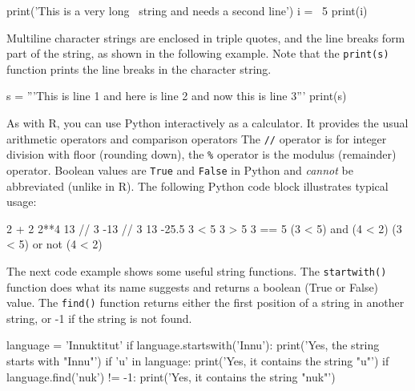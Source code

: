 \begin{samepage}
\begin{pythoncode}
print('This is a very long \
string and needs a second line')
i = \
5
print(i)
\end{pythoncode}
\end{samepage}

\noindent Multiline character strings are enclosed in triple quotes, and the line breaks form part of the string, as shown in the following example. Note that the \texttt{print(s)} function prints the line breaks in the character string.

\begin{samepage}
\begin{pythoncode}
s = '''This is line 1
and here is line 2
and now this is line 3'''
print(s)
\end{pythoncode}
\end{samepage}

\noindent As with R, you can use Python interactively as a calculator. It provides the usual arithmetic operators and comparison operators The \texttt{//} operator is for integer division with floor (rounding down), the \texttt{\%} operator is the modulus (remainder) operator. Boolean values are \texttt{True} and \texttt{False} in Python and \emph{cannot} be abbreviated (unlike in R). The following Python code block illustrates typical usage:

\begin{samepage}
\begin{pythoncode}
2 + 2
2**4
13 // 3
-13 // 3
13 %
-25.5 %
3 < 5
3 > 5
3 == 5
(3 < 5) and (4 < 2)
(3 < 5) or not (4 < 2)
\end{pythoncode}
\end{samepage}

\noindent The next code example shows some useful string functions. The \texttt{startwith()} function does what its name suggests and returns a boolean (True or False) value. The \texttt{find()} function returns either the first position of a string in another string, or -1 if the string is not found. 
\begin{samepage}
\begin{pythoncode}
language = 'Innuktitut'
if language.startswith('Innu'):
    print('Yes, the string starts with "Innu"')
if 'u' in language:
    print('Yes, it contains the string "u"')
if language.find('nuk') != -1:
    print('Yes, it contains the string "nuk"')
\end{pythoncode}
\end{samepage}

